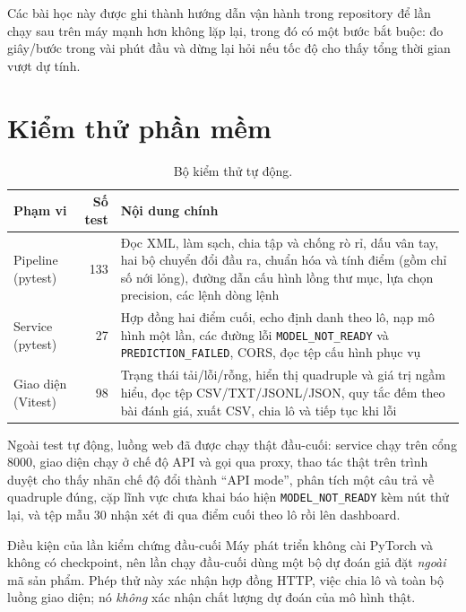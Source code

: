 \documentclass[12pt,a4paper]{report}
\newcommand{\enquote}[1]{“#1”}
\newcommand{\code}[1]{\texttt{#1}}
\begin{document}
Các bài học này được ghi thành hướng dẫn vận hành trong repository để lần chạy sau trên máy mạnh hơn không lặp lại,
trong đó có một bước bắt buộc: đo giây/bước trong vài phút đầu và dừng lại hỏi nếu tốc độ cho thấy tổng thời gian vượt
dự tính.

\section{Kiểm thử phần mềm}

\begin{table}[H]
\centering
\caption{Bộ kiểm thử tự động.}
\begin{tabularx}{\linewidth}{@{}lrX@{}}
\toprule
\textbf{Phạm vi} & \textbf{Số test} & \textbf{Nội dung chính} \\
\midrule
Pipeline (pytest)   & 133 & Đọc XML, làm sạch, chia tập và chống rò rỉ, dấu vân tay, hai bộ chuyển đổi đầu ra, chuẩn hóa và tính điểm (gồm chỉ số nới lỏng), đường dẫn cấu hình lồng thư mục, lựa chọn precision, các lệnh dòng lệnh \\
Service (pytest)    & 27  & Hợp đồng hai điểm cuối, echo định danh theo lô, nạp mô hình một lần, các đường lỗi \code{MODEL\_NOT\_READY} và \code{PREDICTION\_FAILED}, CORS, đọc tệp cấu hình phục vụ \\
Giao diện (Vitest)  & 98  & Trạng thái tải/lỗi/rỗng, hiển thị quadruple và giá trị ngầm hiểu, đọc tệp CSV/TXT/JSONL/JSON, quy tắc đếm theo bài đánh giá, xuất CSV, chia lô và tiếp tục khi lỗi \\
\bottomrule
\end{tabularx}
\end{table}

Ngoài test tự động, luồng web đã được chạy thật đầu-cuối: service chạy trên cổng 8000, giao diện chạy ở chế độ API và
gọi qua proxy, thao tác thật trên trình duyệt cho thấy nhãn chế độ đổi thành \enquote{API mode}, phân tích một câu trả
về quadruple đúng, cặp lĩnh vực chưa khai báo hiện \code{MODEL\_NOT\_READY} kèm nút thử lại, và tệp mẫu 30 nhận xét đi
qua điểm cuối theo lô rồi lên dashboard.

\begin{ghichu}{Điều kiện của lần kiểm chứng đầu-cuối}
Máy phát triển không cài PyTorch và không có checkpoint, nên lần chạy đầu-cuối dùng một bộ dự đoán giả đặt \emph{ngoài}
mã sản phẩm. Phép thử này xác nhận hợp đồng HTTP, việc chia lô và toàn bộ luồng giao diện; nó \emph{không} xác nhận chất
lượng dự đoán của mô hình thật.
\end{ghichu}
\end{document}

